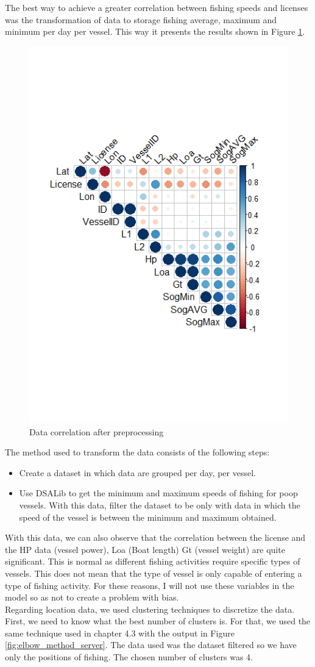 The best way to achieve a greater correlation between fishing speeds and licenses was the transformation of data to storage fishing average, maximum and minimum per day per vessel. This way it presents the results shown in Figure \ref{fig:data_coor2}.

\begin{figure}[h]
    \centering
    \includegraphics[width=0.7\linewidth]{Chapters/img/data_coor2.png}
    \caption{Data correlation after preprocessing}
    \label{fig:data_coor2}
\end{figure}
\newpage
The method used to transform the data consists of the following steps:
\begin{itemize}
\item    Create a dataset in which data are grouped per day, per vessel.
\item    Use DSALib to get the minimum and maximum speeds of fishing for poop vessels. With this data, filter the dataset to be only with data in which the speed of the vessel is between the minimum and maximum obtained.

\end{itemize}

With this data, we can also observe that the correlation between the license and the HP data (vessel power), Loa (Boat length) Gt (vessel weight) are quite significant. This is normal as different fishing activities require specific types of vessels. This does not mean that the type of vessel is only capable of entering a type of fishing activity.
For these reasons, I will not use these variables in the model so as not to create a problem with bias.
\\
Regarding location data, we used clustering techniques to discretize the data.
First, we need to know what the best number of clusters is. For that, we used the same technique used in chapter 4.3 with the output in Figure \ref{fig:elbow_method_server}. The data used was the dataset filtered so we have only the positions of fishing. The chosen number of clusters was 4.

